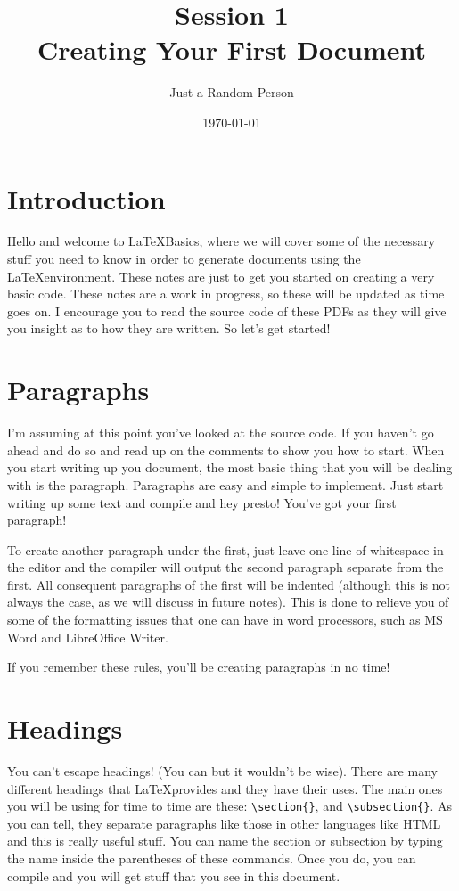 \documentclass[12pt, a4paper]{article}
\title{Session 1 \\ Creating Your First Document}
\author{Just a Random Person}
\date{\today} %
\begin{document}
	
	\maketitle
			
	\section{Introduction}
		Hello and welcome to \LaTeX Basics, where we will cover some of the necessary stuff you need to know in order to generate documents using the \LaTeX environment. These notes are just to get you started on creating a very basic code. These notes are a work in progress, so these will be updated as time goes on. I encourage you to read the source code of these PDFs as they will give you insight as to how they are written. So let's get started!
	
	\section{Paragraphs}
		I'm assuming at this point you've looked at the source code. If you haven't go ahead and do so and read up on the comments to show you how to start. When you start writing up you document, the most basic thing that you will be dealing with is the paragraph. Paragraphs are easy and simple to implement. Just start writing up some text and compile and hey presto! You've got your first paragraph! 
		
		To create another paragraph under the first, just leave one line of whitespace in the editor and the compiler will output the second paragraph separate from the first. All consequent paragraphs of the first will be indented (although this is not always the case, as we will discuss in future notes). This is done to relieve you of some of the formatting issues that one can have in word processors, such as MS Word and LibreOffice Writer.
		
		If you remember these rules, you'll be creating paragraphs in no time!
	
	\section{Headings}
		You can't escape headings! (You can but it wouldn't be wise). There are many different headings that \LaTeX provides and they have their uses. The main ones you will be using for time to time are these: \verb|\section{}|, and \verb|\subsection{}|. As you can tell, they separate paragraphs like those in other languages like HTML and this is really useful stuff. You can name the section or subsection by typing the name inside the parentheses of these commands. Once you do, you can compile and you will get stuff that you see in this document.
		
\end{document}
